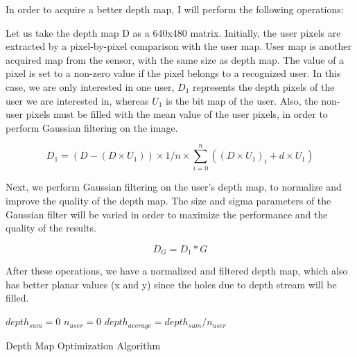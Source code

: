 In order to acquire a better depth map, I will perform the following operations:

Let us take the depth map D as a 640x480 matrix. Initially, the user pixels are
extracted by a pixel-by-pixel comparison with the user map. User map is another
acquired map from the sensor, with the same size as depth map. The value of a
pixel is set to a non-zero value if the pixel belongs to a recognized user. In
this case, we are only interested in one user, $D_1$ represents the depth pixels
of the user we are interested in, whereas $U_1$ is the bit map of the user.
Also, the non-user pixels must be filled with the mean value of the user pixels, in order to perform Gaussian filtering on the image.

\begin{equation}
D_1=(D-(D \times U_1 )) \times 1/n \times \sum\limits_{i=0}^n ((D \times U_1 )_i + d \times U_1 )
\label{eqn:patch_depth}
\end{equation}

Next, we perform Gaussian filtering on the user’s depth map, to normalize and
improve the quality of the depth map. The size and sigma parameters of the Gaussian filter will be varied in order to maximize the performance and the quality of the results. 

\begin{equation}
D_G=D_1*G
\label{eqn:gaussian_convolution}
\end{equation}

After these operations, we have a normalized and filtered depth map, which also
has better planar values (x and y) since the holes due to depth stream will be filled.

\begin{algorithm}
\dontprintsemicolon %
$depth_{sum}=0$ \;
$n_{user} =0$\;
$depth_{average}=depth_{sum}/n_{user}$ \;
 
\caption{Depth Map Optimization Algorithm}
\label{algo:depth_patch}
\end{algorithm}

